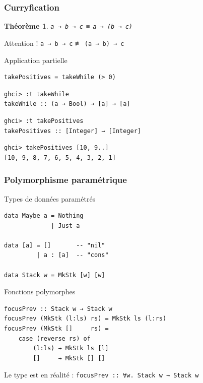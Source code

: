 \documentclass[10pt]{beamer}
\newtheorem{thrm}{Théorème}
\begin{document}
\begin{frame}[fragile]
\frametitle{Curryfication}
\begin{thrm}
\verb|a → b → c| ≡ \verb|a → (b → c)|
\end{thrm}

\pause

\begin{block}
{Attention !}
\verb|a → b → c| ≢ \verb|(a → b) → c|
\end{block}

\pause

\begin{block}
{Application partielle}
\begin{verbatim}
takePositives = takeWhile (> 0)
\end{verbatim}
\pause
\begin{verbatim}
ghci> :t takeWhile
takeWhile :: (a → Bool) → [a] → [a]
\end{verbatim}
\pause
\begin{verbatim}
ghci> :t takePositives
takePositives :: [Integer] → [Integer]
\end{verbatim}
\pause
\begin{verbatim}
ghci> takePositives [10, 9..]
[10, 9, 8, 7, 6, 5, 4, 3, 2, 1]
\end{verbatim}
\end{block}
\end{frame}



\begin{frame}[fragile]
\frametitle{Polymorphisme paramétrique}
\begin{block}
{Types de données paramétrés}
\begin{verbatim}
data Maybe a = Nothing
             | Just a

data [a] = []       -- "nil"
         | a : [a]  -- "cons"

data Stack w = MkStk [w] [w]
\end{verbatim}
\end{block}
\pause
\begin{block}
{Fonctions polymorphes}
\begin{verbatim}
focusPrev :: Stack w → Stack w
focusPrev (MkStk (l:ls) rs) = MkStk ls (l:rs)
focusPrev (MkStk []     rs) =
    case (reverse rs) of
        (l:ls) → MkStk ls [l]
        []     → MkStk [] []
\end{verbatim}
\end{block}
Le type est en réalité : \verb|focusPrev :: ∀w. Stack w → Stack w|
\end{frame}
\end{document}
